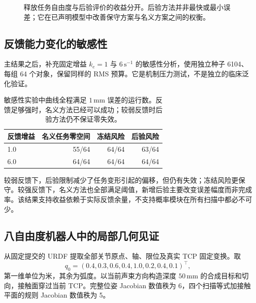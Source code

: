 \documentclass[UTF8,11pt,a4paper,fontset=fandol]{ctexart}
\numberwithin{equation}{section}
\theoremstyle{definition}
\begin{document}
\begin{figure}[ht]\centering
{}
\caption{释放任务自由度与后验评价的收益分开。后验方法并非最快或最小误差；它在已声明模型中改善保守方案与名义方案之间的权衡。}
\end{figure}

\subsection{反馈能力变化的敏感性}
主结果之后，补充固定增益 $k_e=1$ 与 $6\,\mathrm{s^{-1}}$ 的敏感性分析，使用独立种子 6104、每组 64 个对象，保留同样的 RMS 预算。它是机制压力测试，不是独立的临床泛化验证。

\begin{table}[ht]\centering\small
\begin{tabular}{lrrr}\toprule
反馈增益 & 名义任务零空间 & 冻结风险 & 后验风险\\\midrule
1.0 & 55/64 & 64/64 & 63/64\\
6.0 & 64/64 & 64/64 & 64/64\\
\bottomrule\end{tabular}
\caption{敏感性实验中曲线全程满足 $1\,\mathrm{mm}$ 误差的运行数。反馈足够强时，名义方法已经可以成功；较弱反馈时后验方法仍不保证零失效。}
\end{table}

较弱反馈下，后验限制减少了任务变形引起的偏移，但仍有失效；冻结风险更保守。较强反馈下，名义方法也全部满足阈值，新增后验主要改变误差幅度而非完成率。该结果支持收益依赖于实际反馈余量，不支持概率模块在所有扫描中都必不可少。

\subsection{八自由度机器人中的局部几何见证}
从固定提交的 URDF 提取全部关节原点、轴、限位及真实 TCP 固定变换。取
\begin{equation}
 q_0=(0.4,0.3,0.6,0.4,1.0,0.2,0.4,0.1)^\top,
 \label{eq:q0}
\end{equation}
第一维单位为米，其余为弧度。以当前声束方向构造深度 $50\,\mathrm{mm}$ 的合成目标和切向，接触面穿过当前 TCP。完整位姿 Jacobian 数值秩为 6，四个扫描等式加接触平面的规则 Jacobian 数值秩为 5。
\end{document}
